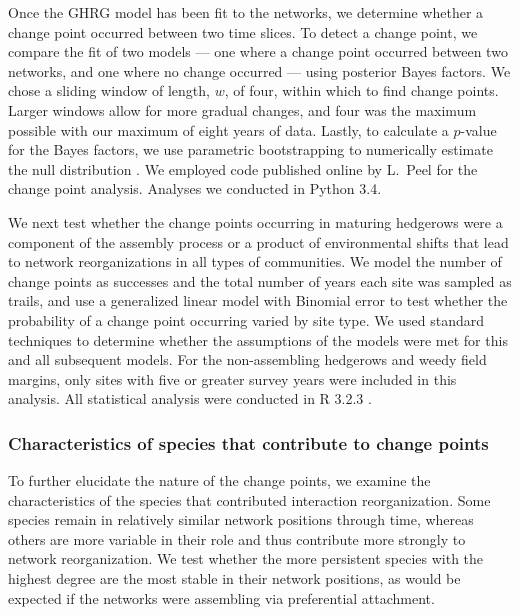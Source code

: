 \documentclass[12pt]{article}
\begin{document}
Once the GHRG model has been fit to the networks, we determine whether
a change point occurred between two time slices. To detect a change
point, we compare the fit of two models --- one where a change point
occurred between two networks, and one where no change occurred ---
using posterior Bayes factors. We chose a sliding window of length,
$w$, of four, within which to find change points. Larger windows allow
for more gradual changes, and four was the maximum possible with our
maximum of eight years of data. Lastly, to calculate a $p$-value for
the Bayes factors, we use parametric bootstrapping to numerically
estimate the null distribution \citep{peel2014detecting}. We employed
code published online by L.~Peel for the change point
analysis. Analyses we conducted in Python 3.4.

We next test whether the change points occurring in maturing hedgerows
were a component of the assembly process or a product of environmental
shifts that lead to network reorganizations in all types of
communities. We model the number of change points as successes and the
total number of years each site was sampled as trails, and use a
generalized linear model with Binomial error to test whether the
probability of a change point occurring varied by site type. We used
standard techniques to determine whether the assumptions of the models
were met for this and all subsequent models. For the non-assembling
hedgerows and weedy field margins, only sites with five or greater
survey years were included in this analysis. All statistical analysis
were conducted in R 3.2.3 \citep{R}.

\subsubsection*{Characteristics of species that contribute to change
  points}

To further elucidate the nature of the change points, we examine the
characteristics of the species that contributed interaction
reorganization. Some species remain in relatively similar network
positions through time, whereas others are more variable in their role
and thus contribute more strongly to network reorganization. We test
whether the more persistent species with the highest degree are the
most stable in their network positions, as would be expected if the
networks were assembling via preferential attachment.
\end{document}

